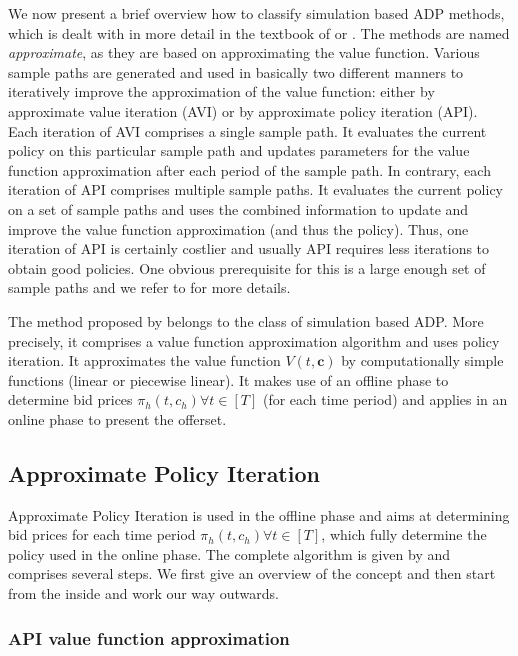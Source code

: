 We now present a brief overview how to classify simulation based ADP methods, which is dealt with in more detail in the textbook of \cite{Bertsekas.2005} or \cite{Powell.2011}. The methods are named \emph{approximate}, as they are based on approximating the value function. Various sample paths are generated and used in basically two different manners to iteratively improve the approximation of the value function: either by approximate value iteration (AVI) or by approximate policy iteration (API). Each iteration of AVI comprises a single sample path. It evaluates the current policy on this particular sample path and updates parameters for the value function approximation after each period of the sample path. In contrary, each iteration of API  comprises multiple sample paths. It evaluates the current policy on a set of sample paths and uses the combined information to update and improve the value function approximation (and thus the policy). Thus, one iteration of API is certainly costlier and usually API requires less iterations to obtain good policies. One obvious prerequisite for this is a large enough set of sample paths and we refer to \cite{Powell.2011} for more details.

The method proposed by \cite{Koch.2017} belongs to the class of simulation based ADP. More precisely, it comprises a value function approximation algorithm and uses policy iteration. It approximates the value function $V(t, \boldsymbol{c})$ by computationally simple functions (linear or piecewise linear). It makes use of an offline phase to determine bid prices $\pi_h(t, c_h) \forall t \in [T]$ (for each time period) and applies  in an online phase to present the offerset.

\subsection{Approximate Policy Iteration}

Approximate Policy Iteration is used in the offline phase and aims at determining bid prices for each time period $\pi_h(t, c_h) \forall t \in [T]$, which fully determine the policy used in the online phase. The complete algorithm is given by  and comprises several steps. We first give an overview of the concept and then start from the inside and work our way outwards.

\subsubsection{API value function approximation}

